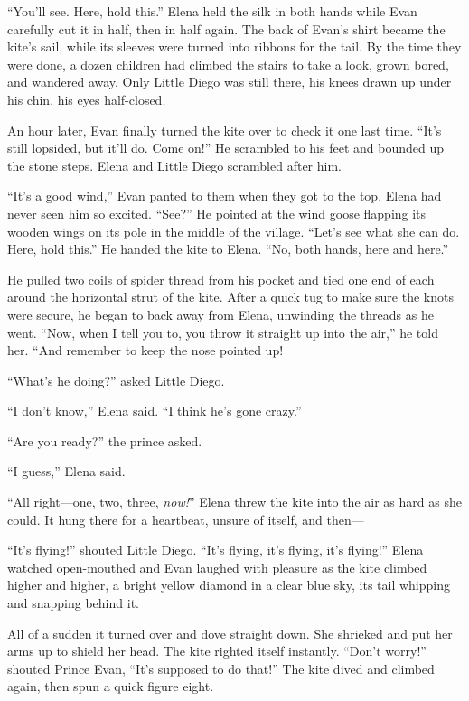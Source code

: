 \documentclass[10pt]{book}
\begin{document}
``You'll see.  Here, hold this.'' Elena held the silk in both hands while Evan carefully cut it in half, then in half again. The back of Evan's shirt became the kite's sail, while its sleeves were turned into ribbons for the tail. By the time they were done, a dozen children had climbed the stairs to take a look, grown bored, and wandered away. Only Little Diego was still there, his knees drawn up under his chin, his eyes half-closed.

An hour later, Evan finally turned the kite over to check it one last time. ``It's still lopsided, but it'll do. Come on!'' He scrambled to his feet and bounded up the stone steps. Elena and Little Diego scrambled after him.

``It's a good wind,'' Evan panted to them when they got to the top. Elena had never seen him so excited. ``See?'' He pointed at the wind goose flapping its wooden wings on its pole in the middle of the village. ``Let's see what she can do. Here, hold this.'' He handed the kite to Elena. ``No, both hands, here and here.''

He pulled two coils of spider thread from his pocket and tied one end of each around the horizontal strut of the kite. After a quick tug to make sure the knots were secure, he began to back away from Elena, unwinding the threads as he went. ``Now, when I tell you to, you throw it straight up into the air,'' he told her. ``And remember to keep the nose pointed up!

``What's he doing?'' asked Little Diego.

``I don't know,'' Elena said. ``I think he's gone crazy.''

``Are you ready?'' the prince asked.

``I guess,'' Elena said.

``All right---one, two, three, \emph{now!}'' Elena threw the kite into the air as hard as she could. It hung there for a heartbeat, unsure of itself, and then---

``It's flying!'' shouted Little Diego. ``It's flying, it's flying, it's flying!'' Elena watched open-mouthed and Evan laughed with pleasure as the kite climbed higher and higher, a bright yellow diamond in a clear blue sky, its tail whipping and snapping behind it.

All of a sudden it turned over and dove straight down. She shrieked and put her arms up to shield her head. The kite righted itself instantly. ``Don't worry!'' shouted Prince Evan, ``It's supposed to do that!'' The kite dived and climbed again, then spun a quick figure eight.
\end{document}
